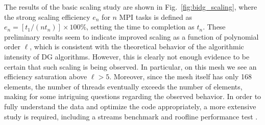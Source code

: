 The results of the basic scaling study are shown in
Fig.~\ref{fig:bidg_scaling}, where the strong scaling efficiency $e_{n}$ for
$n$ MPI tasks is defined as $e_{n}= [t_{1}/(nt_{n})]\times 100\%$, setting the time to
completion as $t_n$. These preliminary results seem to indicate improved scaling as a function of polynomial order $\ell$, which is consistent with the theoretical
behavior of the algorithmic intensity of DG algorithms.  However, this is
clearly not enough evidence to be certain that such scaling is being observed.
In particular, on this mesh we see an efficiency saturation above $\ell>5$.
Moreover, since the mesh itself has only 168 elements, the number of threads
eventually exceeds the number of elements, making for some intriguing questions
regarding the observed behavior.  In order to fully understand the data and
optimize the code appropriately, a more extensive study is required, including
a streams
%
benchmark \cite{McCalpin1995} and roofline performance test
\cite{Williams:2009:RIV:1498765.1498785}.

%
%




